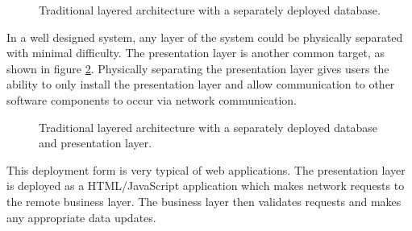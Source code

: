 \begin{figure}[ht]
    \centering
    \caption{Traditional layered architecture with a separately deployed database.}
    \label{fig:layered-db-separated}
\end{figure}

\pagebreak
In a well designed system, any layer of the system could be physically separated with minimal difficulty.
The presentation layer is another common target, as shown in figure \ref{fig:layered-db-pres-separated}.
Physically separating the presentation layer gives users the ability to only install the presentation layer and allow communication to
other software components to occur via network communication.

\begin{figure}[ht]
    \centering
    \caption{Traditional layered architecture with a separately deployed database and presentation layer.}
    \label{fig:layered-db-pres-separated}
\end{figure}

This deployment form is very typical of web applications.
The presentation layer is deployed as a \mbox{HTML/}JavaScript application which makes network requests to the remote business layer.
The business layer then validates requests and makes any appropriate data updates.

